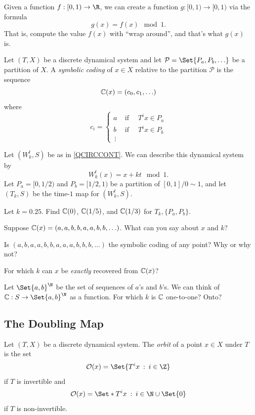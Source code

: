 	Given a function $f:[0,1)\to\R$, we can create a function $g:[0,1)\to[0,1)$ via the formula
	\[
		g(x) = f(x)\mod 1.
	\]
	That is, compute the value $f(x)$ with ``wrap around'', and that's what $g(x)$ is.

	\begin{definition}
		Let $(T,X)$ be a discrete dynamical system and let $\mathcal P=\Set{P_a,P_b,\ldots}$
		be a partition of $X$. A \emph{symbolic coding} of $x\in X$ relative to the partition $\mathcal P$
		is the sequence 
		\[
			\mathbb{C}(x)=(c_0,c_1,\ldots)
		\]
		where
		\[
			c_i = \begin{cases}
				a &\text{ if }\quad T^ix\in P_a\\
				b &\text{ if }\quad T^ix\in P_b\\
				\,\vdots &
			\end{cases}
		\]
	\end{definition}


	\question
	Let $(W^t_k,S)$ be as in \ref{QCIRCCONT}. We can describe this dynamical system by
	\[
		W^t_k(x) = x+kt\mod 1.
	\]
	Let $P_a=[0,1/2)$ and $P_b=[1/2,1)$ be a partition of $[0,1]/0\sim 1$, and let $(T_k,S)$
	be the time-$1$ map for $(W^t_k,S)$.
	\begin{parts}
		\item Let $k=0.25$. Find $\mathbb{C}(0)$, $\mathbb{C}(1/5)$, and $\mathbb{C}(1/3)$ for $T_k,\{P_a,P_b\}$.
		\item Suppose $\mathbb{C}(x)=(a,a,b,b,a,a,b,b,\ldots)$. What can you say about $x$ and $k$?
		\item Is $(a,b,a,a,b,b,a,a,a,b,b,b,\ldots)$ the symbolic coding of any point? Why or why not?
		\item For which $k$ can $x$ be \emph{exactly} recovered from $\mathbb{C}(x)$?
		\item Let $\Set{a,b}^\N$ be the set of sequences of $a$'s and $b$'s. We can think
			of $\C:S\to\Set{a,b}^\N$ as a function. For which $k$ is $\mathbb{C}$ one-to-one? Onto?
	\end{parts}

	\newpage
	\subsection*{The Doubling Map}
	\begin{definition}[Orbit]
		Let $(T,X)$ be a discrete dynamical system. The \emph{orbit} of a point $x\in X$
		under $T$ is the set
		\[
			\mathcal O(x)=\Set{T^ix\given i\in\Z}
		\]
		if $T$ is invertible and 
		\[
			\mathcal O(x)=\Set*{T^ix\given i\in \N\cup\Set{0}}
		\]
		if $T$ is non-invertible.
	\end{definition}
	
